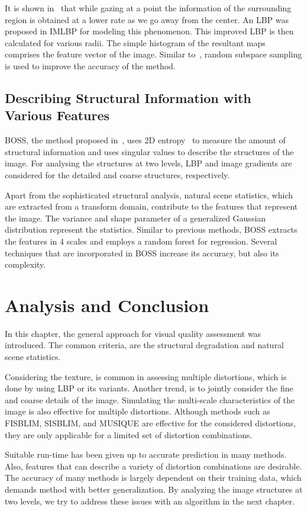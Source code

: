 It is shown in~\cite{Pelli2008} that while gazing at a point the information of the surrounding region is obtained at a lower rate as we go away from the center. An LBP was proposed in IMLBP for modeling this phenomenon. This improved LBP is then calculated for various radii. The simple histogram of the resultant maps comprises the feature vector of the image. Similar to~\cite{Dai2018}, random subspace sampling is used to improve the accuracy of the method.
\subsection{Describing Structural Information with Various Features}
BOSS, the method proposed in~\cite{Zhou2018}, uses 2D entropy~\cite{Zheng2009} to measure the amount of structural information and uses singular values to describe the structures of the image. For analysing the structures at two levels, LBP and image gradients are considered for the detailed and coarse structures, respectively.

Apart from the sophisticated structural analysis, natural scene statistics, which are extracted from a transform domain, contribute to the features that represent the image. The variance and shape parameter of a generalized Gaussian distribution represent the statistics. Similar to previous methods, BOSS extracts the features in 4 scales and employs a random forest for regression. Several techniques that are incorporated in BOSS increase its accuracy, but also its complexity.
\section{Analysis and Conclusion}
In this chapter, the general approach for visual quality assessment was introduced. The common criteria, are the structural degradation and natural scene statistics.

Considering the texture, is common in assessing multiple distortions, which is done by using LBP or its variants. Another trend, is to jointly consider the fine and coarse details of the image. Simulating the multi-scale characteristics of the image is also effective for multiple distortions. Although methods such as FISBLIM, SISBLIM, and MUSIQUE are effective for the considered distortions, they are only applicable for a limited set of distortion combinations.

Suitable run-time has been given up to accurate prediction in many methods. Also, features that can describe a variety of distortion combinations are desirable. The accuracy of many methods is largely dependent on their training data, which demands method with better generalization. By analyzing the image structures at two levels, we try to address these issues with an algorithm in the next chapter.